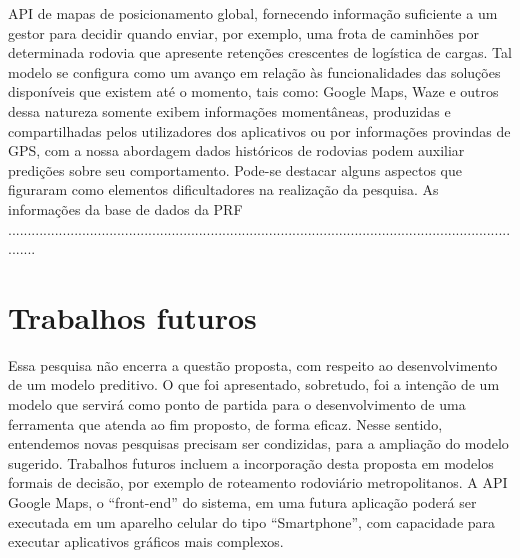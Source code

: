API de mapas de posicionamento global, fornecendo
informação suficiente a um gestor para decidir quando enviar,
por exemplo, uma frota de caminhões por determinada rodovia
que apresente retenções crescentes de logística de cargas.
Tal modelo se configura como um avanço em relação às funcionalidades das soluções disponíveis que existem até o momento, tais como: Google Maps, Waze e outros dessa natureza somente exibem informações
momentâneas, produzidas e compartilhadas pelos utilizadores
dos aplicativos ou por informações provindas de GPS, com a
nossa abordagem dados históricos de rodovias podem auxiliar
predições sobre seu comportamento.
Pode-se destacar alguns aspectos que figuraram como elementos dificultadores na realização da pesquisa. As informações da base de dados da PRF ........................................................................................................................................

\section{Trabalhos futuros}

Essa pesquisa não encerra a questão proposta, com respeito ao desenvolvimento de um modelo preditivo. O que foi apresentado, sobretudo, foi a intenção de um modelo que servirá como ponto de partida para o desenvolvimento de uma ferramenta que atenda ao fim proposto, de forma eficaz. Nesse sentido, entendemos novas pesquisas precisam ser condizidas, para a ampliação do modelo sugerido. 
Trabalhos futuros incluem a incorporação desta proposta
em modelos formais de decisão, por exemplo de roteamento
rodoviário metropolitanos. A API Google Maps, o ``front-end'' do sistema, em uma futura aplicação poderá ser executada em um aparelho 
celular do tipo ``Smartphone'', com capacidade para executar aplicativos gráficos mais complexos.